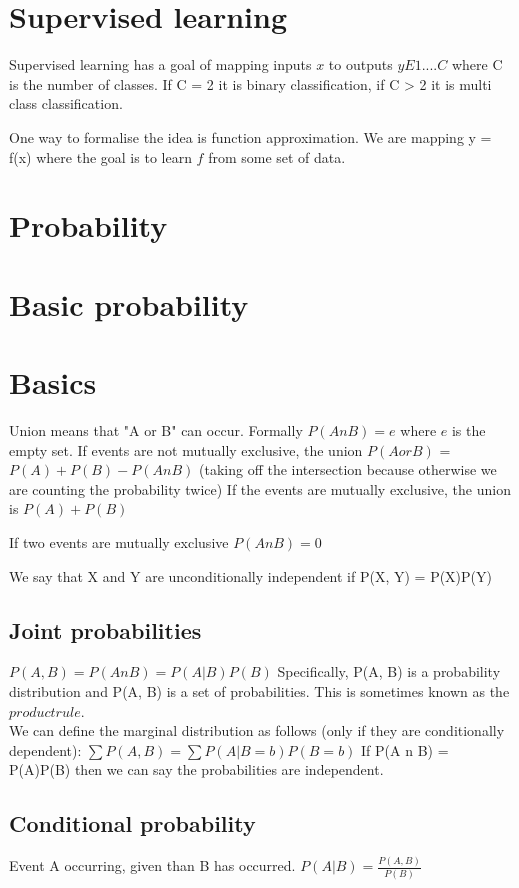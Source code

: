 \documentclass[11pt]{article}
\begin{document}
\section{Supervised learning}
Supervised learning has a goal of mapping inputs $x$ to outputs $y E {1....C}$ where C is the number of classes. If C = 2 it is binary classification, if C > 2 it is multi class classification. 

One way to formalise the idea is function approximation. We are mapping y = f(x) where the goal is to learn $f$ from some set of data. 

\section{Probability}

\section{Basic probability}
\section{Basics}
Union means that "A or B" can occur. Formally $P(A n B) = e$ where $e$ is the empty set. 
If events are not mutually exclusive, the union $P(A or B)$ = $P(A) + P(B) - P(A n B)$ (taking off the intersection because otherwise we are counting the probability twice)
If the events are mutually exclusive, the union is $P(A) + P(B)$

If two events are mutually exclusive $P(A n B) = 0$

We say that X and Y are unconditionally independent if P(X, Y) = P(X)P(Y)

\subsection*{Joint probabilities}
$P(A, B) = P(A n B) = P(A|B)P(B)$
Specifically, P(A, B) is a probability distribution and P(A, B) is a set of probabilities. 
This is sometimes known as the $product rule$. \\
We can define the marginal distribution as follows (only if they are conditionally dependent):
$\sum{P(A, B)} = \sum{P(A|B = b)P(B=b)}$
If P(A n B) = P(A)P(B) then we can say the probabilities are independent. 

\subsection*{Conditional probability}
Event A occurring, given than B has occurred. 
$P(A|B) = \frac{P(A, B)}{P(B)}$
\end{document}
